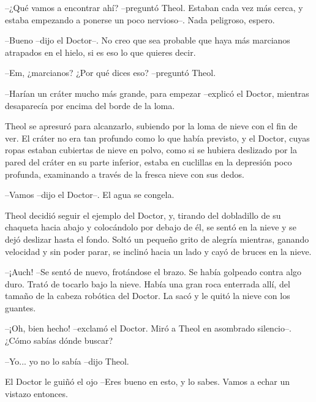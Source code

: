 --¿Qué vamos a encontrar ahí? --preguntó Theol. Estaban cada vez más cerca, y estaba empezando a ponerse un poco nervioso--. Nada peligroso, espero.



--Bueno --dijo el Doctor--. No creo que sea probable que haya más marcianos atrapados en el hielo, si es eso lo que quieres decir.



--Em, ¿marcianos? ¿Por qué dices eso? --preguntó Theol.



--Harían un cráter mucho más grande, para empezar --explicó el Doctor, mientras desaparecía por encima del borde de la loma.



Theol se apresuró para alcanzarlo, subiendo por la loma de nieve con el fin de ver. El cráter no era tan profundo como lo que había previsto, y el Doctor, cuyas ropas estaban cubiertas de nieve en polvo, como si se hubiera deslizado por la pared del cráter en su parte inferior, estaba en cuclillas en la depresión poco profunda, examinando a través de la fresca nieve con sus dedos.



--Vamos --dijo el Doctor--. El agua se congela.



Theol decidió seguir el ejemplo del Doctor, y, tirando del dobladillo de su chaqueta hacia abajo y colocándolo por debajo de él, se sentó en la nieve y se dejó deslizar hasta el fondo. Soltó un pequeño grito de alegría mientras, ganando velocidad y sin poder parar, se inclinó hacia un lado y cayó de bruces en la nieve.



--¡Auch! --Se sentó de nuevo, frotándose el brazo. Se había golpeado contra algo duro. Trató de tocarlo bajo la nieve. Había una gran roca enterrada allí, del tamaño de la cabeza robótica del Doctor. La sacó y le quitó la nieve con los guantes.



--¡Oh, bien hecho! --exclamó el Doctor. Miró a Theol en asombrado silencio--. ¿Cómo sabías dónde buscar?



--Yo... yo no lo sabía --dijo Theol.



El Doctor le guiñó el ojo --Eres bueno en esto, y lo sabes. Vamos a echar un vistazo entonces.



